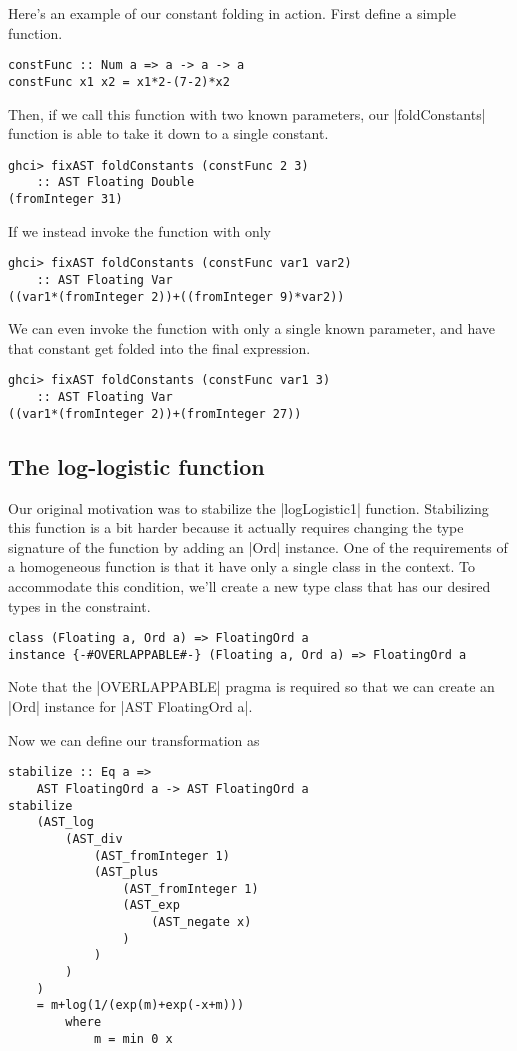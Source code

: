 \documentclass[preprint]{sigplanconf}
\theoremstyle{definition}
\begin{document}
Here's an example of our constant folding in action.
First define a simple function.
\begin{lstlisting}
constFunc :: Num a => a -> a -> a
constFunc x1 x2 = x1*2-(7-2)*x2
\end{lstlisting}
Then, if we call this function with two known parameters,
our |foldConstants| function is able to take it down to a single constant.
\begin{lstlisting}
ghci> fixAST foldConstants (constFunc 2 3)
    :: AST Floating Double
(fromInteger 31)
\end{lstlisting}
If we instead invoke the function with only
\begin{lstlisting}
ghci> fixAST foldConstants (constFunc var1 var2)
    :: AST Floating Var
((var1*(fromInteger 2))+((fromInteger 9)*var2))
\end{lstlisting}
We can even invoke the function with only a single known parameter,
and have that constant get folded into the final expression.
\begin{lstlisting}
ghci> fixAST foldConstants (constFunc var1 3)
    :: AST Floating Var
((var1*(fromInteger 2))+(fromInteger 27))
\end{lstlisting}

\subsection{The log-logistic function}

Our original motivation was to stabilize the |logLogistic1| function.
Stabilizing this function is a bit harder because it actually requires changing the type signature of the function by adding an |Ord| instance.
One of the requirements of a homogeneous function is that it have only a single class in the context.
To accommodate this condition, we'll create a new type class that has our desired types in the constraint.
\begin{lstlisting}
class (Floating a, Ord a) => FloatingOrd a
instance {-#OVERLAPPABLE#-} (Floating a, Ord a) => FloatingOrd a
\end{lstlisting}
Note that the |OVERLAPPABLE| pragma is required so that we can create an |Ord| instance for |AST FloatingOrd a|.

Now we can define our transformation as
\begin{lstlisting}
stabilize :: Eq a =>
    AST FloatingOrd a -> AST FloatingOrd a
stabilize
    (AST_log
        (AST_div
            (AST_fromInteger 1)
            (AST_plus
                (AST_fromInteger 1)
                (AST_exp
                    (AST_negate x)
                )
            )
        )
    )
    = m+log(1/(exp(m)+exp(-x+m)))
        where
            m = min 0 x
\end{lstlisting}
\end{document}
